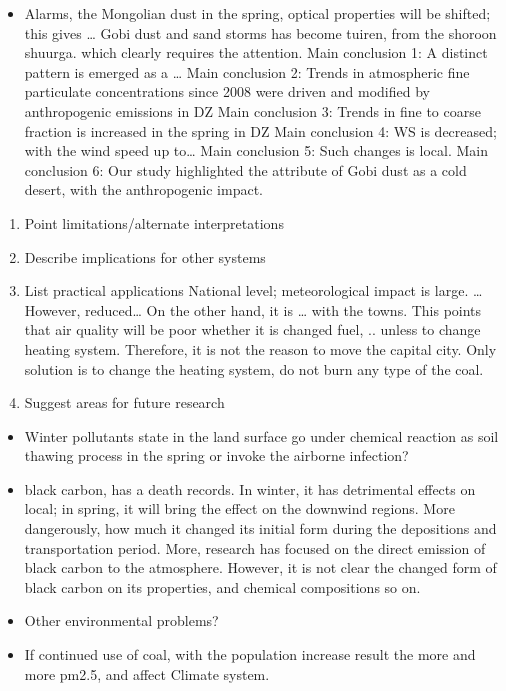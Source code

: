 \documentclass[
  11pt,
]{article}
\providecommand{\tightlist}{%
  \setlength{\itemsep}{0pt}\setlength{\parskip}{0pt}}
\begin{document}
\begin{itemize}
\tightlist
\item
  Alarms, the Mongolian dust in the spring, optical properties will be
  shifted; this gives \ldots{} Gobi dust and sand storms has become
  tuiren, from the shoroon shuurga. which clearly requires the
  attention. Main conclusion 1: A distinct pattern is emerged as a
  \ldots{} Main conclusion 2: Trends in atmospheric fine particulate
  concentrations since 2008 were driven and modified by anthropogenic
  emissions in DZ Main conclusion 3: Trends in fine to coarse fraction
  is increased in the spring in DZ Main conclusion 4: WS is decreased;
  with the wind speed up to\ldots{} Main conclusion 5: Such changes is
  local. Main conclusion 6: Our study highlighted the attribute of Gobi
  dust as a cold desert, with the anthropogenic impact.
\end{itemize}

\begin{enumerate}
\def\labelenumi{\arabic{enumi}.}
\setcounter{enumi}{3}
\item
  Point limitations/alternate interpretations
\item
  Describe implications for other systems
\item
  List practical applications National level; meteorological impact is
  large. \ldots{} However, reduced\ldots{} On the other hand, it is
  \ldots{} with the towns. This points that air quality will be poor
  whether it is changed fuel, .. unless to change heating system.
  Therefore, it is not the reason to move the capital city. Only
  solution is to change the heating system, do not burn any type of the
  coal.
\item
  Suggest areas for future research
\end{enumerate}

\begin{itemize}
\tightlist
\item
  Winter pollutants state in the land surface go under chemical reaction
  as soil thawing process in the spring or invoke the airborne
  infection?
\item
  black carbon, has a death records. In winter, it has detrimental
  effects on local; in spring, it will bring the effect on the downwind
  regions. More dangerously, how much it changed its initial form during
  the depositions and transportation period. More, research has focused
  on the direct emission of black carbon to the atmosphere. However, it
  is not clear the changed form of black carbon on its properties, and
  chemical compositions so on.
\item
  Other environmental problems?
\item
  If continued use of coal, with the population increase result the more
  and more pm2.5, and affect Climate system.
\end{itemize}
\end{document}
